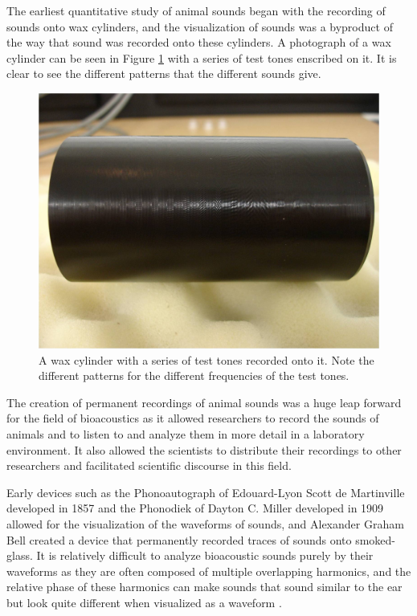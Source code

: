 \documentclass[12pt,oneside]{book}
\begin{document}
The earliest quantitative study of animal sounds began with the
recording of sounds onto wax cylinders, and the visualization of
sounds was a byproduct of the way that sound was recorded onto these
cylinders.  A photograph of a wax cylinder can be seen in Figure
\ref{fig:waxCylinder} with a series of test tones enscribed on it.  It
is clear to see the different patterns that the different sounds give.

\begin{figure}[t]
\centering
\includegraphics[width=\columnwidth]{figures/waxCylinder}
\caption{A wax cylinder with a series of test tones recorded onto it.
  Note the different patterns for the different frequencies of the
  test tones.}
\label{fig:waxCylinder}
\end{figure}


The creation of permanent recordings of animal sounds was a huge leap
forward for the field of bioacoustics as it allowed researchers to
record the sounds of animals and to listen to and analyze them in more
detail in a laboratory environment.  It also allowed the scientists to
distribute their recordings to other researchers and facilitated
scientific discourse in this field.

Early devices such as the Phonoautograph of Edouard-Lyon Scott de
Martinville developed in 1857 and the Phonodiek of Dayton C. Miller
developed in 1909 allowed for the visualization of the waveforms of
sounds, and Alexander Graham Bell created a device that permanently
recorded traces of sounds onto smoked-glass.  It is relatively
difficult to analyze bioacoustic sounds purely by their waveforms as
they are often composed of multiple overlapping harmonics, and the
relative phase of these harmonics can make sounds that sound similar
to the ear but look quite different when visualized as a waveform
\cite{au2000hearing}.
\end{document}
